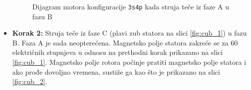 \documentclass[diplomskirad, upload]{fer}
\begin{document}
\begin{itemize}
\begin{figure}[h!]
		      \caption{Dijagram motora konfiguracije \texttt{3s4p} kada struja teče iz faze A u fazu B}
		      \label{fig:aub}
	      \end{figure}

	\item \textbf{Korak 2:} Struja teče iz faze C (plavi zub statora na slici \ref{fig:cub_1}) u fazu B. Faza A je sada neopterećena. Magnetsko polje statora zakreće se za 60 električnih stupnjeva u odnosu na prethodni korak prikazano na slici \ref{fig:cub_1}{}. Magnetsko polje rotora počinje pratiti magnetsko polje statora i ako prođe dovoljno vremena, sustiže ga kao što je prikazano na slici \ref{fig:cub_2}{}.
	      \begin{figure}[h!]
		      \centering


\end{figure}
\end{itemize}
\end{document}
